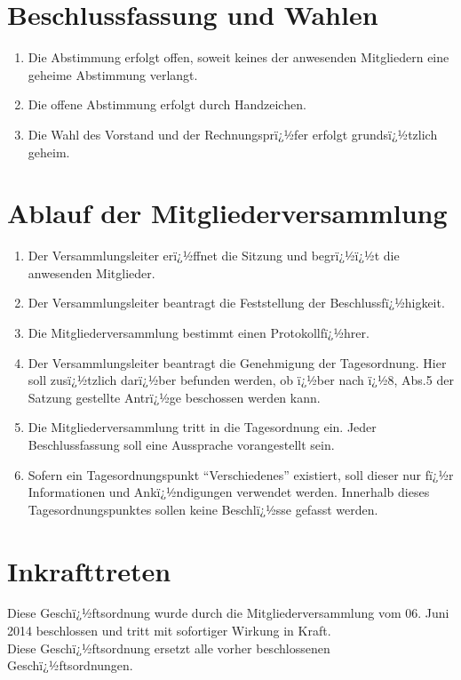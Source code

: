 \documentclass[a4paper, 12pt]{scrartcl}
\begin{document}
\section{Beschlussfassung und Wahlen}
\begin{enumerate}
	\item Die Abstimmung erfolgt offen, soweit keines der anwesenden Mitgliedern eine geheime Abstimmung verlangt.
	\item Die offene Abstimmung erfolgt durch Handzeichen.
	\item Die Wahl des Vorstand und der Rechnungsprï¿½fer erfolgt grundsï¿½tzlich geheim.
\end{enumerate}

\section{Ablauf der Mitgliederversammlung}
\begin{enumerate} 
	\item Der Versammlungsleiter erï¿½ffnet die Sitzung und begrï¿½ï¿½t die anwesenden Mitglieder.
	\item Der Versammlungsleiter beantragt die Feststellung der Beschlussfï¿½higkeit.
	\item Die Mitgliederversammlung bestimmt einen Protokollfï¿½hrer.
	\item Der Versammlungsleiter beantragt die Genehmigung der Tagesordnung. Hier soll zusï¿½tzlich darï¿½ber befunden werden, ob ï¿½ber nach ï¿½8, Abs.5 der Satzung gestellte Antrï¿½ge beschossen werden kann.
	\item Die Mitgliederversammlung tritt in die Tagesordnung ein. Jeder Beschlussfassung soll eine Aussprache vorangestellt sein.
	\item Sofern ein Tagesordnungspunkt "`Verschiedenes"' existiert, soll dieser nur fï¿½r Informationen und Ankï¿½ndigungen verwendet werden. Innerhalb dieses Tagesordnungspunktes sollen keine Beschlï¿½sse gefasst werden.
\end{enumerate}

\section{Inkrafttreten}
Diese Geschï¿½ftsordnung wurde durch die Mitgliederversammlung vom 06. Juni 2014 beschlossen und tritt mit sofortiger Wirkung in Kraft.\\
Diese Geschï¿½ftsordnung ersetzt alle vorher beschlossenen Geschï¿½ftsordnungen.
\end{document}
